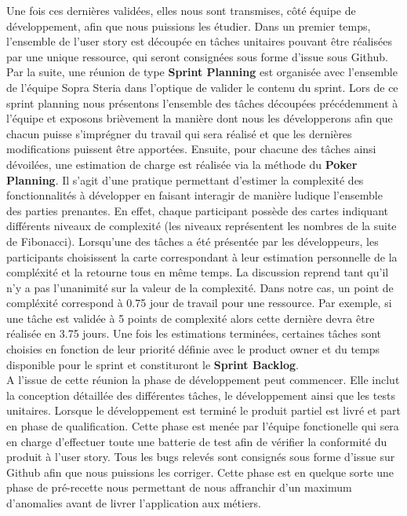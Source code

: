 	Une fois ces dernières validées, elles nous sont transmises, côté équipe de développement, afin que nous puissions les étudier. Dans un premier temps, l’ensemble de l’user story est découpée en tâches unitaires pouvant être réalisées par une unique ressource, qui seront consignées sous forme d’issue sous Github. Par la suite, une réunion de type \textbf{Sprint Planning} est organisée avec l'ensemble de l'équipe Sopra Steria dans l’optique de valider le contenu du sprint. Lors de ce sprint planning nous présentons l’ensemble des tâches découpées précédemment à l’équipe et exposons brièvement la manière dont nous les développerons afin que chacun puisse s’imprégner du travail qui sera réalisé et que les dernières modifications puissent être apportées. Ensuite, pour chacune des tâches ainsi dévoilées, une estimation de charge est réalisée via la méthode du \textbf{Poker Planning}. Il s’agit d’une pratique permettant d’estimer la complexité des fonctionnalités à développer en faisant interagir de manière ludique l’ensemble des parties prenantes. En effet, chaque participant possède des cartes indiquant différents niveaux de complexité (les niveaux représentent les nombres de la suite de Fibonacci). Lorsqu’une des tâches a été présentée par les développeurs, les participants choisissent la carte correspondant à leur estimation personnelle de la compléxité et la retourne tous en même temps. La discussion reprend tant qu’il n’y a pas l’unanimité sur la valeur de la complexité. Dans notre cas, un point de compléxité correspond à 0.75 jour de travail pour une ressource. Par exemple, si une tâche est validée à 5 points de complexité alors cette dernière devra être réalisée en 3.75 jours. Une fois les estimations terminées, certaines tâches sont choisies en fonction de leur priorité définie avec le product owner et du temps disponible pour le sprint et constituront le \textbf{Sprint Backlog}.\\
	
	A l'issue de cette réunion la phase de développement peut commencer. Elle inclut la conception détaillée des différentes tâches, le développement ainsi que les tests unitaires. Lorsque le développement est terminé le produit partiel est livré et part en phase de qualification. Cette phase est menée par l'équipe fonctionelle qui sera en charge d'effectuer toute une batterie de test afin de vérifier la conformité du produit à l'user story. Tous les bugs relevés sont consignés sous forme d'issue sur Github afin que nous puissions les corriger. Cette phase est en quelque sorte une phase de pré-recette nous permettant de nous affranchir d'un maximum d'anomalies avant de livrer l'application aux métiers.

